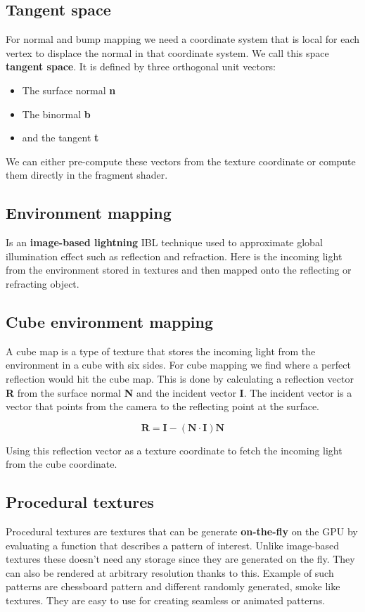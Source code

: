 	\subsection*{Tangent space}
	For normal and bump mapping we need a coordinate system that is local for each vertex to displace the normal in that coordinate system. We call this space \textbf{tangent space}. It is defined by three orthogonal unit vectors:

		\begin{itemize}
			\item The surface normal \textbf{n}
			\item The binormal \textbf{b}
			\item and the tangent \textbf{t}
		\end{itemize}

	We can either pre-compute these vectors from the texture coordinate or compute them directly in the fragment shader. 

	\subsection*{Environment mapping}
	Is an \textbf{image-based lightning} IBL technique used to approximate global illumination effect such as reflection and refraction. Here is the incoming light from the environment stored in textures and then mapped onto the reflecting or refracting object. 

	\subsection*{Cube environment mapping}
	A cube map is a type of texture that stores the incoming light from the environment in a cube with six sides. For cube mapping we find where a perfect reflection would hit the cube map. This is done by calculating a reflection vector \textbf{R} from the surface normal \textbf{N} and the incident vector \textbf{I}. The incident vector is a vector that points from the camera to the reflecting point at the surface. 

	\begin{equation}
	 \textbf{R} = \textbf{I} - (\textbf{N} \cdot \textbf{I}) \textbf{N}
	 \end{equation} 

	 Using this reflection vector as a texture coordinate to fetch the incoming light from the cube coordinate. 

	 \subsection*{Procedural textures}
	 Procedural textures are textures that can be generate \textbf{on-the-fly} on the GPU by evaluating a function that describes a pattern of interest. Unlike image-based textures these doesn't need any storage since they are generated on the fly. They can also be rendered at arbitrary resolution thanks to this. Example of such patterns are chessboard pattern and different randomly generated, smoke like textures. They are easy to use for creating seamless or animated patterns. 

